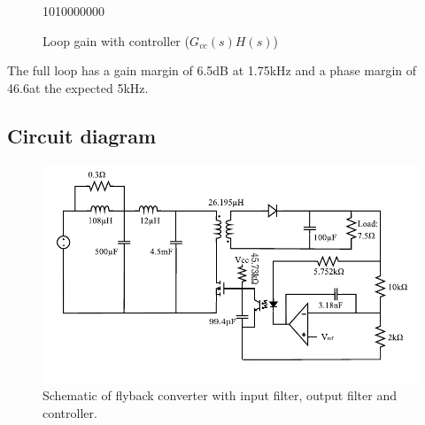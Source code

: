 \begin{figure}[H]
    \centering
    {10}{10000000}
    \caption{Loop gain with controller ($G_{vc}(s)H(s)$)}
    \label{fig:bp3}
\end{figure}

The full loop has a gain margin of 6.5dB at 1.75kHz and a phase margin of 46.6\degree at the expected 5kHz.

\subsection{Circuit diagram}
\begin{figure}[H]
    \centering
    \includegraphics[width=\linewidth]{report_final/Pictures/schematic.pdf}
    \caption{Schematic of flyback converter with input filter, output filter and controller.}
    \label{fig:sch}
\end{figure}